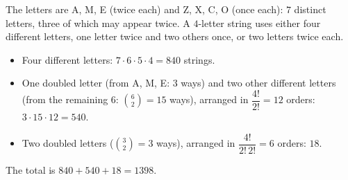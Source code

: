 The letters are A, M, E (twice each) and Z, X, C, O (once each): $7$ distinct letters, three of which may appear twice. A $4$-letter string uses either four different letters, one letter twice and two others once, or two letters twice each.
\begin{itemize}
\item Four different letters: $7\cdot6\cdot5\cdot4=840$ strings.
\item One doubled letter (from A, M, E: $3$ ways) and two other different letters (from the remaining $6$: $\binom62=15$ ways), arranged in $\dfrac{4!}{2!}=12$ orders: $3\cdot15\cdot12=540$.
\item Two doubled letters ($\binom32=3$ ways), arranged in $\dfrac{4!}{2!\,2!}=6$ orders: $18$.
\end{itemize}
The total is $840+540+18=\boxed{1398}$.
